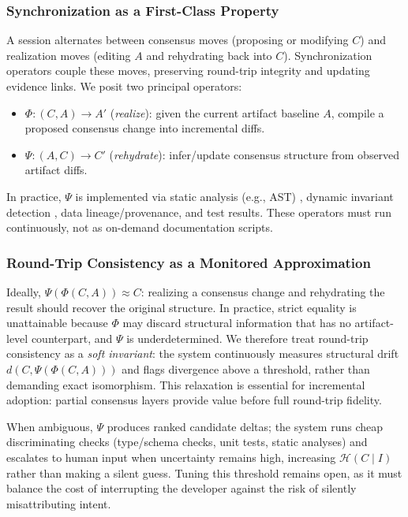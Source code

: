 \subsubsection{Synchronization as a First-Class Property}
A session alternates between consensus moves (proposing or modifying $C$) and realization moves (editing $A$ and rehydrating back into $C$). Synchronization operators couple these moves, preserving round-trip integrity and updating evidence links.
We posit two principal operators:
\begin{itemize}[leftmargin=*, itemsep=2pt]
  \item $\Phi: (C, A) \rightarrow A'$ \quad (\emph{realize}): given the current artifact baseline $A$, compile a proposed consensus change into incremental diffs.
  \item $\Psi: (A, C) \rightarrow C'$ \quad (\emph{rehydrate}): infer/update consensus structure from observed artifact diffs.
\end{itemize}
In practice, $\Psi$ is implemented via static analysis (e.g., AST) \cite{yamaguchi2014cpg}, dynamic invariant detection \cite{ernst2007daikon}, data lineage/provenance, and test results. These operators must run continuously, not as on-demand documentation scripts.

\subsubsection{Round-Trip Consistency as a Monitored Approximation}
Ideally, $\Psi(\Phi(C, A)) \approx C$: realizing a consensus change and rehydrating the result should recover the original structure.
In practice, strict equality is unattainable because $\Phi$ may discard structural information that has no artifact-level counterpart, and $\Psi$ is underdetermined.
We therefore treat round-trip consistency as a \emph{soft invariant}: the system continuously measures structural drift $d(C, \Psi(\Phi(C,A)))$ and flags divergence above a threshold, rather than demanding exact isomorphism.
This relaxation is essential for incremental adoption: partial consensus layers provide value before full round-trip fidelity.

When ambiguous, $\Psi$ produces ranked candidate deltas; the system runs cheap discriminating checks (type/schema checks, unit tests, static analyses) and escalates to human input when uncertainty remains high, increasing $\mathcal{H}(C\mid I)$ rather than making a silent guess. Tuning this threshold remains open, as it must balance the cost of interrupting the developer against the risk of silently misattributing intent. 

